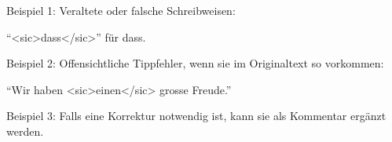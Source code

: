 \documentclass[12pt, a4paper, ngerman, bidi=default]{article}
\begin{document}
\begin{description}
    \noindent{} Beispiel 1: Veraltete oder falsche Schreibweisen: 

    \colorbox{VeryLightGray}{\enquote{{<sic>dass</sic>}} für dass.}

     Beispiel 2: Offensichtliche Tippfehler, wenn sie im Originaltext so vorkommen: 

    \colorbox{VeryLightGray}{\enquote{Wir haben {<sic>einen</sic>} grosse Freude.}}

     Beispiel 3: Falls eine Korrektur notwendig ist, kann sie als Kommentar ergänzt werden. 

    \end{description}



    \endgroup
\end{document}
